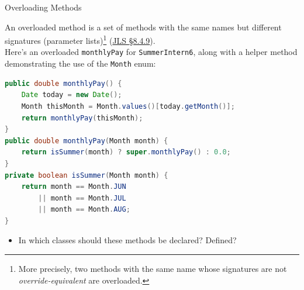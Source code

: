 \documentclass{beamer}
\begin{document}
\begin{frame}[fragile]{Overloading Methods}


An overloaded method is a set of methods with the same names but different signatures (parameter lists)\footnote{More precisely, two methods with the same name whose signatures are not {\it override-equivalent} are overloaded.} (\href{http://docs.oracle.com/javase/specs/jls/se7/html/jls-8.html#jls-8.4.9}{JLS \S 8.4.9}).\\
\vspace{.075in}
Here's an overloaded {\tt monthlyPay} for {\tt SummerIntern6}, along with a helper method demonstrating the use of the {\tt Month} enum:
\begin{lstlisting}[language=Java]
public double monthlyPay() {
    Date today = new Date();
    Month thisMonth = Month.values()[today.getMonth()];
    return monthlyPay(thisMonth);
}
public double monthlyPay(Month month) {
    return isSummer(month) ? super.monthlyPay() : 0.0;
}
private boolean isSummer(Month month) {
    return month == Month.JUN 
        || month == Month.JUL 
        || month == Month.AUG;
}
\end{lstlisting}
\vspace{-.075in}
\begin{itemize}
\item In which classes should these methods be declared? Defined?
\end{itemize}


\end{frame}
\end{document}
